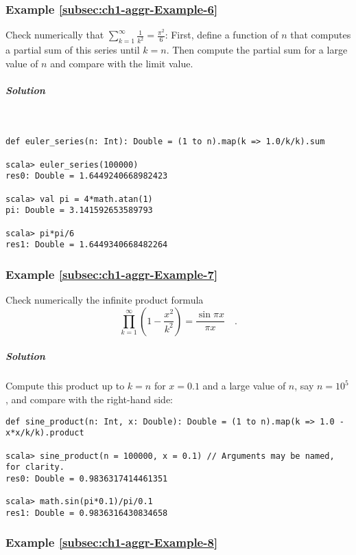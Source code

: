 \subsubsection{Example \label{subsec:ch1-aggr-Example-6}\ref{subsec:ch1-aggr-Example-6}}

Check numerically that $\sum_{k=1}^{\infty}\frac{1}{k^{2}}=\frac{\pi^{2}}{6}$:
First, define a function of $n$ that computes a partial sum of this
series until $k=n$. Then compute the partial sum for a large value
of $n$ and compare with the limit value.

\subparagraph{Solution}

~

\begin{lstlisting}
def euler_series(n: Int): Double = (1 to n).map(k => 1.0/k/k).sum

scala> euler_series(100000)
res0: Double = 1.6449240668982423

scala> val pi = 4*math.atan(1)
pi: Double = 3.141592653589793

scala> pi*pi/6
res1: Double = 1.6449340668482264 
\end{lstlisting}


\subsubsection{Example \label{subsec:ch1-aggr-Example-7}\ref{subsec:ch1-aggr-Example-7}}

Check numerically the infinite product formula
\[
\prod_{k=1}^{\infty}\left(1-\frac{x^{2}}{k^{2}}\right)=\frac{\sin\pi x}{\pi x}\quad.
\]


\subparagraph{Solution}

Compute this product up to $k=n$ for $x=0.1$ and a large value of
$n$, say $n=10^{5}$, and compare with the right-hand side:
\begin{lstlisting}
def sine_product(n: Int, x: Double): Double = (1 to n).map(k => 1.0 - x*x/k/k).product

scala> sine_product(n = 100000, x = 0.1) // Arguments may be named, for clarity.
res0: Double = 0.9836317414461351

scala> math.sin(pi*0.1)/pi/0.1
res1: Double = 0.9836316430834658
\end{lstlisting}


\subsubsection{Example \label{subsec:ch1-aggr-Example-8}\ref{subsec:ch1-aggr-Example-8}}

